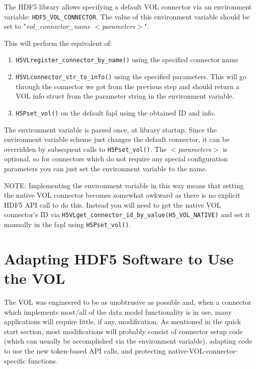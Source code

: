 The HDF5 library allows specifying a default VOL connector via an environment variable: {\tt HDF5\_VOL\_CONNECTOR}. The value of this environment variable should be set to "\textit{vol\_connector\_name $<$parameters$>$}".

This will perform the equivalent of:

\begin{enumerate}
    \item {\tt H5VLregister\_connector\_by\_name()} using the specified connector name
    \item {\tt H5VLconnector\_str\_to\_info()} using the specified parameters. This will go through the connector we got from the previous step and should return a VOL info struct from the parameter string in the environment variable.
    \item {\tt H5Pset\_vol()} on the default fapl using the obtained ID and info.
\end{enumerate}

The environment variable is parsed once, at library startup. Since the environment variable scheme just changes the default connector, it can be overridden by subsequent calls to {\tt H5Pset\_vol()}. The \textit{$<$parameters$>$} is optional, so for connectors which do not require any special configuration parameters you can just set the environment variable to the name.

NOTE: Implementing the environment variable in this way means that setting the native VOL connector becomes somewhat awkward as there is no explicit HDF5 API call to do this. Instead you will need to get the native VOL connector's ID via {\tt H5VLget\_connector\_id\_by\_value(H5\_VOL\_NATIVE)} and set it manually in the fapl using {\tt H5Pset\_vol()}.

\section{Adapting HDF5 Software to Use the VOL}

The VOL was engineered to be as unobtrusive as possible and, when a connector which implements most/all of the data model functionality is in use, many applications will require little, if any, modification. As mentioned in the quick start section, most modifications will probably consist of connector setup code (which can usually be accomplished via the environment variable), adapting code to use the new token-based API calls, and protecting native-VOL-connector-specific functions.

